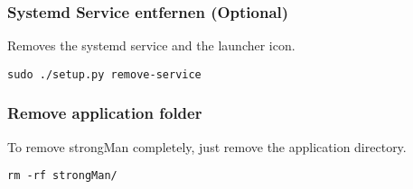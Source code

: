 \subsubsection{Systemd Service entfernen (Optional)}
Removes the systemd service and the launcher icon.
\begin{lstlisting}[style=BashInputStyle]
    sudo ./setup.py remove-service
\end{lstlisting}

\subsubsection{Remove application folder}
To remove strongMan completely, just remove the application directory.
\begin{lstlisting}[style=BashInputStyle]
    rm -rf strongMan/
\end{lstlisting}

